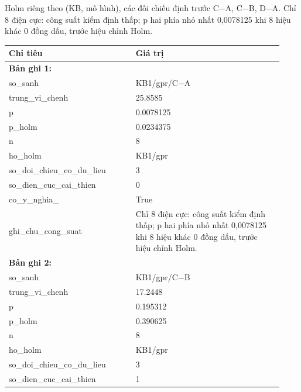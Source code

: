 \par\smallskip\noindent Holm riêng theo (KB, mô hình), các đối chiếu định trước C−A, C−B, D−A. Chỉ 8 điện cực: công suất kiểm định thấp; p hai phía nhỏ nhất 0,0078125 khi 8 hiệu khác 0 đồng dấu, trước hiệu chỉnh Holm.\par
\begin{longtable}{p{0.43\linewidth}p{0.50\linewidth}}
\toprule Chỉ tiêu & Giá trị \\ \midrule \endhead
\multicolumn{2}{p{0.95\linewidth}}{\textbf{Bản ghi 1: }} \\
so\_\allowbreak sanh & KB1/gpr/C−A \\
trung\_\allowbreak vi\_\allowbreak chenh & 25.8585 \\
p & 0.0078125 \\
p\_\allowbreak holm & 0.0234375 \\
n & 8 \\
ho\_\allowbreak holm & KB1/gpr \\
so\_\allowbreak doi\_\allowbreak chieu\_\allowbreak co\_\allowbreak du\_\allowbreak lieu & 3 \\
so\_\allowbreak dien\_\allowbreak cuc\_\allowbreak cai\_\allowbreak thien & 0 \\
co\_\allowbreak y\_\allowbreak nghia\_\allowbreak 005 & True \\
ghi\_\allowbreak chu\_\allowbreak cong\_\allowbreak suat & Chỉ 8 điện cực: công suất kiểm định thấp; p hai phía nhỏ nhất 0,0078125 khi 8 hiệu khác 0 đồng dấu, trước hiệu chỉnh Holm. \\
\midrule
\multicolumn{2}{p{0.95\linewidth}}{\textbf{Bản ghi 2: }} \\
so\_\allowbreak sanh & KB1/gpr/C−B \\
trung\_\allowbreak vi\_\allowbreak chenh & 17.2448 \\
p & 0.195312 \\
p\_\allowbreak holm & 0.390625 \\
n & 8 \\
ho\_\allowbreak holm & KB1/gpr \\
so\_\allowbreak doi\_\allowbreak chieu\_\allowbreak co\_\allowbreak du\_\allowbreak lieu & 3 \\
so\_\allowbreak dien\_\allowbreak cuc\_\allowbreak cai\_\allowbreak thien & 1 \\

\end{longtable}
